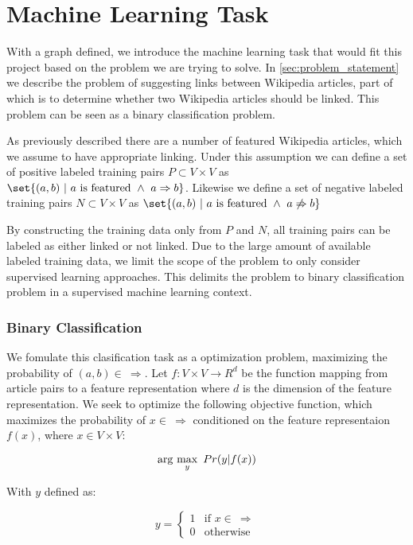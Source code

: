 \section{Machine Learning Task}\label{sec:machine_learning_task}
With a graph defined, we introduce the machine learning task that would fit this project based on the problem we are trying to solve. In \cref{sec:problem_statement} we describe the problem of suggesting links between Wikipedia articles, part of which is to determine whether two Wikipedia articles should be linked. This problem can be seen as a binary classification problem.

As previously described there are a number of featured Wikipedia articles, which we assume to have appropriate linking. Under this assumption we can define a set of positive labeled training pairs $P \subset V \times V$ as $\set{(a,b)\ |\ a\text{ is featured}\ \wedge\ a \Rightarrow b}$. Likewise we define a set of negative labeled training pairs $N \subset V \times V$ as $\set{(a,b)\ |\ a\text{ is featured}\ \wedge\ a \not\Rightarrow b}$

By constructing the training data only from $P$ and $N$, all training pairs can be labeled as either linked or not linked. Due to the large amount of available labeled training data, we limit the scope of the problem to only consider supervised learning approaches. This delimits the problem to binary classification problem in a supervised machine learning context.

\subsubsection{Binary Classification}

We fomulate this clasification task as a optimization problem, maximizing the probability of $(a,b) \in \ \Rightarrow$. Let $f: V\times V \to R^d$ be the function mapping from article pairs to a feature representation where $d$ is the dimension of the feature representation.
We seek to optimize the following objective function, which maximizes the probability of $x \in \ \Rightarrow$ conditioned on the feature representaion $f(x)$, where $x \in V \times V$:

\begin{equation}
\label{objective}
\arg\ \!\max_y\ Pr(y | f(x))
\end{equation}

With $y$ defined as:

\[
    y=
\begin{cases}
    1 & \text{if } x \in \  \Rightarrow\\
    0 & \text{otherwise}
\end{cases}
\]

